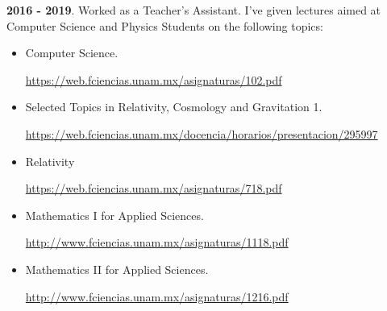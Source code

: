 \documentclass[a4paper,10pt]{article} %
\begin{document}
\textbf{2016 - 2019}. Worked as a Teacher's Assistant. I've given lectures aimed at Computer Science and Physics Students on the following topics:
\begin{itemize}
	\item Computer Science.
	
	\href{https://web.fciencias.unam.mx/asignaturas/102.pdf}{https://web.fciencias.unam.mx/asignaturas/102.pdf}
	
	\item Selected Topics in Relativity, Cosmology and Gravitation 1.
	
	\href{https://web.fciencias.unam.mx/docencia/horarios/presentacion/295997}{https://web.fciencias.unam.mx/docencia/horarios/presentacion/295997}
	
	\item Relativity
	
	\href{https://web.fciencias.unam.mx/asignaturas/718.pdf}{https://web.fciencias.unam.mx/asignaturas/718.pdf}
	
	\item Mathematics I for Applied Sciences. 
	
	\href{http://www.fciencias.unam.mx/asignaturas/1118.pdf}{http://www.fciencias.unam.mx/asignaturas/1118.pdf}
	
	\item Mathematics II for Applied Sciences.
	
	\href{http://www.fciencias.unam.mx/asignaturas/1216.pdf}{http://www.fciencias.unam.mx/asignaturas/1216.pdf}
\end{itemize}
\bigskip

\end{document}
